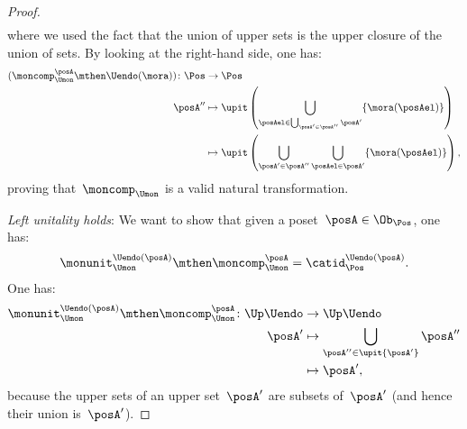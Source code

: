 \begin{proof}
\begin{equation}
\begin{aligned}
        \end{aligned}
    \end{equation}
    where we used the fact that the union of upper sets is the upper closure of the union of sets.
    By looking at the right-hand side, one has:
    \begin{equation}
        \begin{aligned}
            (\moncomp_{\Umon}^\posA \mthen \Uendo(\mora))
            \colon \Pos & \to \Pos                                                                                                \\
            \posA''     & \mapsto \upit \left( \bigcup_{\posAel \in \bigcup_{\posA'\in \posA''}\posA'} \{ \mora(\posAel)\}\right) \\
                        & \mapsto \upit \left( \bigcup_{\posA'\in \posA''}\bigcup_{\posAel \in \posA'}\{\mora(\posAel)\}\right),
        \end{aligned}
    \end{equation}
    proving that~$\moncomp_{\Umon}$ is a valid natural transformation.

    \emph{Left unitality holds}: We want to show that given a poset~$\posA\in \Ob_\Pos$, one has:
    \begin{equation}
        \monunit_{\Umon}^{\Uendo(\posA)}\mthen \moncomp_{\Umon}^{\posA}=\catid_{\Pos}^{\Uendo(\posA)}.
    \end{equation}
    One has:
    \begin{equation}
        \begin{aligned}
            \monunit_{\Umon}^{\Uendo(\posA)}\mthen \moncomp_{\Umon}^{\posA}\colon \Up \Uendo & \to \Up \Uendo                                         \\
            \posA'                                                                           & \mapsto \bigcup_{\posA''\in \upit \{ \posA'\}} \posA'' \\
                                                                                             & \mapsto \posA',
        \end{aligned}
    \end{equation}
    because the upper sets of an upper set~$\posA'$ are subsets of~$\posA'$ (and hence their union is~$\posA'$).


\end{proof}
